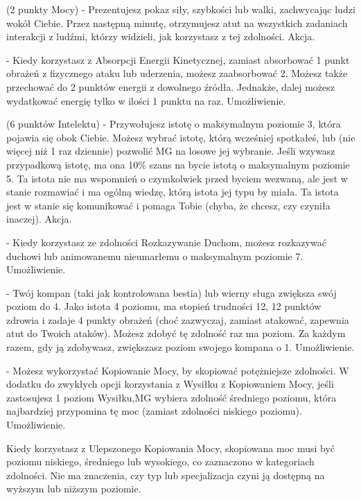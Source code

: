 { (2 punkty Mocy) - Prezentujesz pokaz siły, szybkości lub walki, zachwycając ludzi wokół Ciebie. Przez następną minutę, otrzymujesz atut na wszystkich zadaniach interakcji z ludźmi, którzy widzieli, jak korzystasz z tej zdolności. Akcja.

 - Kiedy korzystasz z Absorpcji Energii Kinetycznej, zamiast absorbować 1 punkt obrażeń z fizycznego ataku lub uderzenia, możesz zaabsorbować 2. Możesz także przechować do 2 punktów energii z dowolnego źródła. Jednakże, dalej możesz wydatkować energię tylko w ilości 1 punktu na raz. Umożliwienie. 

 (6 punktów Intelektu) - Przywołujesz istotę o maksymalnym poziomie 3, która pojawia się obok Ciebie. Możesz wybrać istotę, którą wcześniej spotkałeś, lub (nie więcej niż 1 raz dziennie) pozwolić MG na losowe jej wybranie. Jeśli wzywasz przypadkową istotę, ma ona 10\% szans na bycie istotą o maksymalnym poziomie 5. Ta istota nie ma wspomnień o czymkolwiek przed byciem wezwaną, ale jest w stanie rozmawiać i ma ogólną wiedzę, którą istota jej typu by miała. Ta istota jest w stanie się komunikować i pomaga Tobie (chyba, że chcesz, czy czyniła inaczej). Akcja.

 - Kiedy korzystasz ze zdolności Rozkazywanie Duchom, możesz rozkazywać duchowi lub animowanemu nieumarłemu o maksymalnym poziomie 7. Umożliwienie.

 - Twój kompan (taki jak kontrolowana bestia) lub wierny sługa zwiększa swój poziom do 4. Jako istota 4 poziomu, ma stopień trudności 12, 12 punktów zdrowia i zadaje 4 punkty obrażeń (choć zazwyczaj, zamiast atakować, zapewnia atut do Twoich ataków). Możesz zdobyć tę zdolność raz ma poziom. Za każdym razem, gdy ją zdobywasz, zwiększasz poziom swojego kompana o 1. Umożliwienie.

 - Możesz wykorzystać Kopiowanie Mocy, by skopiować potężniejsze zdolności. W dodatku do zwykłych opcji korzystania z Wysiłku z Kopiowaniem Mocy, jeśli zastosujesz 1 poziom Wysiłku,MG wybiera zdolność średniego poziomu, która najbardziej przypomina tę moc (zamiast zdolności niskiego poziomu). Umożliwienie.

Kiedy korzystasz z Ulepszonego Kopiowania Mocy, skopiowana moc musi być poziomu niskiego, średniego lub wysokiego,  co zaznaczono w kategoriach zdolności. Nie ma znaczenia, czy typ lub specjalizacja czyni ją dostępną na wyższym lub niższym poziomie.

}
